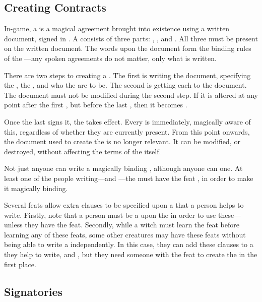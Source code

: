 \subsection{Creating Contracts}

In-game, a {\contract} is a magical agreement brought into existence using a written document, signed in .
A {\contract} consists of three parts: {\stipulations}, {\penalties}, and {\signatories}.
All three must be present on the written document.
The words upon the document form the binding rules of the {\contract}---any spoken agreements do not matter, only what is written.

There are two steps to creating a {\contract}.
The first is writing the document, specifying the {\stipulations}, the {\penalties}, and who the {\signatories} are to be.
The second is getting each {\signatory} to {\sign} the document.
The document must not be modified during the second step.
If it is altered at any point after the first {\signatory} {\signs}, but before the last {\signatory} {\signs}, then it becomes {\void}.

Once the last {\signatory} signs it, the {\contract} takes effect.
Every {\signatory} is immediately, magically aware of this, regardless of whether they are currently present.
From this point onwards, the document used to create the {\contract} is no longer relevant.
It can be modified, or destroyed, without affecting the terms of the {\contract} itself.

Not just anyone can write a magically binding {\contract}, although anyone can {\sign} one.
At least one of the people writing---and {\signing}---the {\contract} must have the feat , in order to make it magically binding.

Several feats allow extra clauses to be specified upon a {\contract} that a person helps to write.
Firstly, note that a person must be a {\signatory} upon the {\contract} in order to use these---unless they have the  feat.
Secondly, while a witch must learn the feat  before learning any of these feats, some other creatures may have these feats without being able to write a {\contract} independently. %
In this case, they can add these clauses to a {\contract} they help to write, and {\sign}, but they need someone with the  feat to create the {\contract} in the first place.

\subsection{Signatories}

